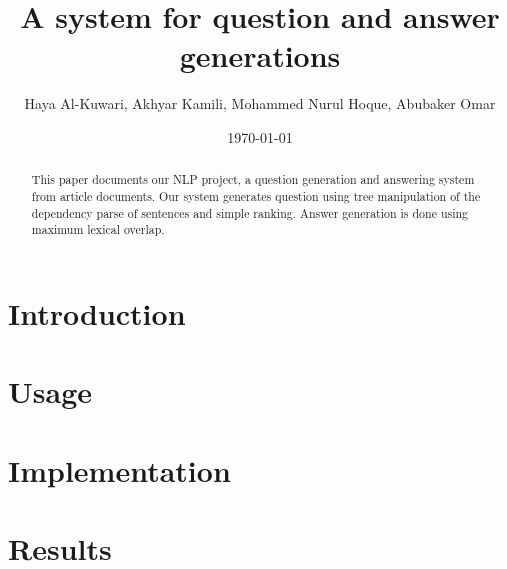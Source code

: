 \documentclass{article}
\title{A system for question and answer generations}
\author{Haya Al-Kuwari, Akhyar Kamili, Mohammed Nurul Hoque, Abubaker Omar}
\date{\today}
\begin{document}
    \maketitle
    \begin{abstract}
        This paper documents our NLP project, a question generation and answering system from
        article documents. Our system generates question using tree manipulation of the dependency
        parse of sentences and simple ranking. Answer generation is done using maximum lexical
        overlap.
    \end{abstract}        
    \section{Introduction}
    \section{Usage}
    \section{Implementation}
    \section{Results}
\end{document}
